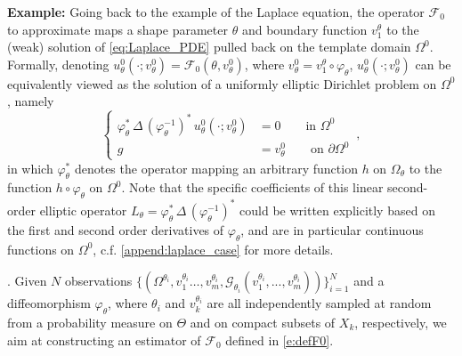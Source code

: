 \documentclass[review]{elsarticle}
\def\Omegathetai{{\Omega^{\theta_i}}}
\def\refd{0}
\def\Omegaref{{\Omega^\refd}}
\def\F0{{\mathcal{F}_{\refd}}}
\begin{document}
\begin{mdframed}
\textbf{Example:}
Going back to the example of the Laplace equation, the operator $\F0$ to approximate maps a shape parameter $\theta$ and boundary function $v_1^\theta$ to the (weak) solution of \eqref{eq:Laplace_PDE} pulled back on the template domain $\Omegaref$. Formally, denoting $u^\refd_{\theta}(\cdot;v^\refd_\theta) = \F0(\theta,v^\refd_\theta)$, where $v^\refd_\theta = v_1^\theta \circ \varphi_\theta$, $u^\refd_{\theta}(\cdot;v^\refd_\theta)$ can be equivalently viewed as the solution of a uniformly elliptic Dirichlet problem on $\Omegaref$, namely 
\begin{equation}
\label{eq:Laplace_PDE_can_domain}
\begin{cases}
    \varphi_\theta^* \, \Delta \, (\varphi_\theta^{-1})^* \, u^\refd_{\theta}(\cdot;v^\refd_\theta) &= 0 \qquad \text{in }\Omegaref \\
    g&=v^\refd_\theta \qquad \text{on } \partial\Omegaref
\end{cases}\,,
\end{equation}
in which $\varphi_\theta^*$ denotes the operator mapping an arbitrary function $h$ on $\Omega_\theta$ to the function $h \circ \varphi_\theta$ on $\Omegaref$. Note that the specific coefficients of this linear second-order elliptic operator $L_\theta = \varphi_\theta^* \, \Delta \, (\varphi_\theta^{-1})^*$ could be written explicitly based on the first and second order derivatives of $\varphi_\theta$, and are in particular continuous functions on $\Omega^0$, c.f. \ref{append:laplace_case} for more details.
\end{mdframed}

. Given $N$ observations $\{(\Omegathetai,v_1^{\theta_i} \dots,v_m^{\theta_i},\mathcal{G}_{\theta_i}(v^{\theta_i}_{1},...,v^{\theta_i}_{m}))\}_{i=1}^N$ and a diffeomorphism $\varphi_\theta$, where $\theta_i$ and $v_k^{\theta_i}$ are all independently sampled at random from a probability measure on $\Theta$ and on compact subsets of $X_k$, respectively, we aim at constructing an estimator of $\F0$ defined in \eqref{e:defF0}.
\end{document}
